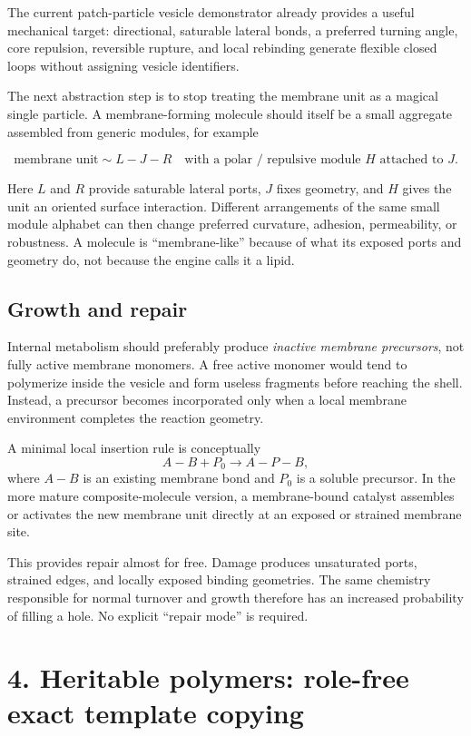 \documentclass[10pt,a4paper]{article}
\begin{document}
The current patch-particle vesicle demonstrator already provides a useful mechanical target: directional, saturable lateral bonds, a preferred turning angle, core repulsion, reversible rupture, and local rebinding generate flexible closed loops without assigning vesicle identifiers.

The next abstraction step is to stop treating the membrane unit as a magical single particle. A membrane-forming molecule should itself be a small aggregate assembled from generic modules, for example

\[
\text{membrane unit} \sim L - J - R \quad \text{with a polar / repulsive module } H \text{ attached to } J.
\]

Here $L$ and $R$ provide saturable lateral ports, $J$ fixes geometry, and $H$ gives the unit an oriented surface interaction. Different arrangements of the same small module alphabet can then change preferred curvature, adhesion, permeability, or robustness. A molecule is ``membrane-like'' because of what its exposed ports and geometry do, not because the engine calls it a lipid.

\subsection{Growth and repair}

Internal metabolism should preferably produce \emph{inactive membrane precursors}, not fully active membrane monomers. A free active monomer would tend to polymerize inside the vesicle and form useless fragments before reaching the shell. Instead, a precursor becomes incorporated only when a local membrane environment completes the reaction geometry.

A minimal local insertion rule is conceptually
\[
A{-}B + P_0 \longrightarrow A{-}P{-}B,
\]
where $A{-}B$ is an existing membrane bond and $P_0$ is a soluble precursor. In the more mature composite-molecule version, a membrane-bound catalyst assembles or activates the new membrane unit directly at an exposed or strained membrane site.

This provides repair almost for free. Damage produces unsaturated ports, strained edges, and locally exposed binding geometries. The same chemistry responsible for normal turnover and growth therefore has an increased probability of filling a hole. No explicit ``repair mode'' is required.

\section{4. Heritable polymers: role-free exact template copying}
\end{document}
